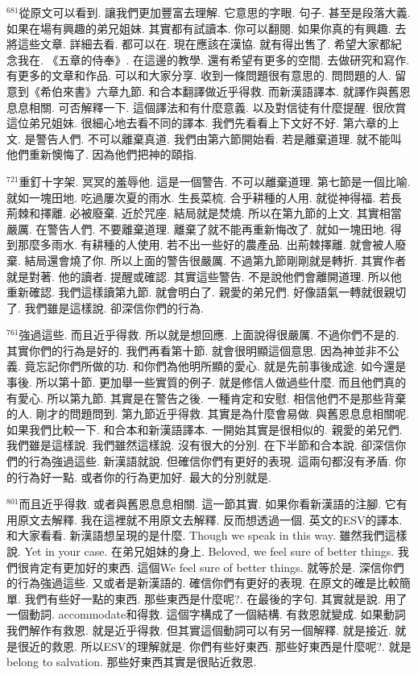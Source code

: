 \documentclass{book}
\begin{document}
$^{681}$從原文可以看到.
讓我們更加豐富去理解.
它意思的字眼.
句子.
甚至是段落大義.
如果在場有興趣的弟兄姐妹.
其實都有試讀本.
你可以翻閱.
如果你真的有興趣.
去將這些文章.
詳細去看.
都可以在.
現在應該在漢協.
就有得出售了.
希望大家都紀念我在.
《五章的侍奉》.
在這邊的教學.
還有希望有更多的空間.
去做研究和寫作.
有更多的文章和作品.
可以和大家分享.
收到一條問題很有意思的.
問問題的人.
留意到《希伯來書》六章九節.
和合本翻譯做近乎得救.
而新漢語譯本.
就譯作與舊恩息息相關.
可否解釋一下.
這個譯法和有什麼意義.
以及對信徒有什麼提醒.
很欣賞這位弟兄姐妹.
很細心地去看不同的譯本.
我們先看看上下文好不好.
第六章的上文.
是警告人們.
不可以離棄真道.
我們由第六節開始看.
若是離棄道理.
就不能叫他們重新懊悔了.
因為他們把神的頤指.

$^{721}$重釘十字架.
冥冥的羞辱他.
這是一個警告.
不可以離棄道理.
第七節是一個比喻.
就如一塊田地.
吃過屢次夏的雨水.
生長菜梳.
合乎耕種的人用.
就從神得福.
若長荊棘和擇離.
必被廢棄.
近於咒座.
結局就是焚燒.
所以在第九節的上文.
其實相當嚴厲.
在警告人們.
不要離棄道理.
離棄了就不能再重新悔改了.
就如一塊田地.
得到那麼多雨水.
有耕種的人使用.
若不出一些好的農產品.
出荊棘擇離.
就會被人廢棄.
結局還會燒了你.
所以上面的警告很嚴厲.
不過第九節剛剛就是轉折.
其實作者就是對著.
他的讀者.
提醒或確認.
其實這些警告.
不是說他們會離開道理.
所以他重新確認.
我們這樣讀第九節.
就會明白了.
親愛的弟兄們.
好像語氣一轉就很親切了.
我們雖是這樣說.
卻深信你們的行為.

$^{761}$強過這些.
而且近乎得救.
所以就是想回應.
上面說得很嚴厲.
不過你們不是的.
其實你們的行為是好的.
我們再看第十節.
就會很明顯這個意思.
因為神並非不公義.
竟忘記你們所做的功.
和你們為他明所顯的愛心.
就是先前事後成途.
如今還是事後.
所以第十節.
更加舉一些實質的例子.
就是修信人做過些什麼.
而且他們真的有愛心.
所以第九節.
其實是在警告之後.
一種肯定和安慰.
相信他們不是那些背棄的人.
剛才的問題問到.
第九節近乎得救.
其實是為什麼會易做.
與舊恩息息相關呢.
如果我們比較一下.
和合本和新漢語譯本.
一開始其實是很相似的.
親愛的弟兄們.
我們雖是這樣說.
我們雖然這樣說.
沒有很大的分別.
在下半節和合本說.
卻深信你們的行為強過這些.
新漢語就說.
但確信你們有更好的表現.
這兩句都沒有矛盾.
你的行為好一點.
或者你的行為更加好.
最大的分別就是.

$^{801}$而且近乎得救.
或者與舊恩息息相關.
這一節其實.
如果你看新漢語的注腳.
它有用原文去解釋.
我在這裡就不用原文去解釋.
反而想透過一個.
英文的ESV的譯本.
和大家看看.
新漢語想呈現的是什麼.
Though we speak in this way.
雖然我們這樣說.
Yet in your case.
在弟兄姐妹的身上.
Beloved, we feel sure of better things.
我們很肯定有更加好的東西.
這個We feel sure of better things.
就等於是.
深信你們的行為強過這些.
又或者是新漢語的.
確信你們有更好的表現.
在原文的確是比較簡單.
我們有些好一點的東西.
那些東西是什麼呢?.
在最後的字句.
其實就是說.
用了一個動詞.
accommodate和得救.
這個字構成了一個結構.
有救恩就變成.
如果動詞我們解作有救恩.
就是近乎得救.
但其實這個動詞可以有另一個解釋.
就是接近.
就是很近的救恩.
所以ESV的理解就是.
你們有些好東西.
那些好東西是什麼呢?.
就是belong to salvation.
那些好東西其實是很貼近救恩.
\end{document}
